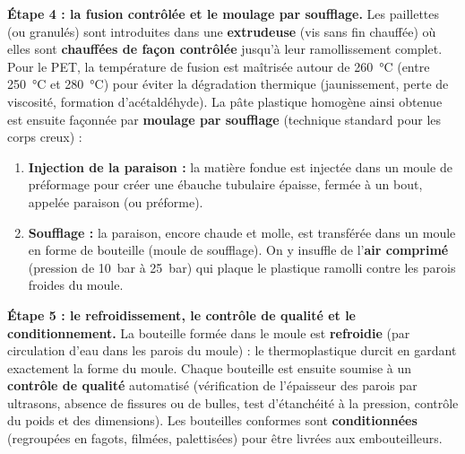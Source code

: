 \documentclass[11pt]{article}
\newcommand{\cle}[1]{{\popxbold\color{popdark}#1}}
\begin{document}
\textbf{Étape 4 : la fusion contrôlée et le moulage par soufflage.} Les paillettes (ou granulés) sont introduites dans une \textbf{extrudeuse} (vis sans fin chauffée) où elles sont \textbf{chauffées de façon contrôlée} jusqu'à leur ramollissement complet. Pour le PET, la température de fusion est maîtrisée autour de \SI{260}{\celsius} (entre \SI{250}{\celsius} et \SI{280}{\celsius}) pour éviter la dégradation thermique (jaunissement, perte de viscosité, formation d'acétaldéhyde). La pâte plastique homogène ainsi obtenue est ensuite façonnée par \textbf{moulage par soufflage} (technique standard pour les corps creux) :
\begin{enumerate}
\item \textbf{Injection de la paraison :} la matière fondue est injectée dans un moule de préformage pour créer une ébauche tubulaire épaisse, fermée à un bout, appelée \cle{paraison} (ou préforme).
\item \textbf{Soufflage :} la paraison, encore chaude et molle, est transférée dans un moule en forme de bouteille (moule de soufflage). On y insuffle de l'\textbf{air comprimé} (pression de \SI{10}{\bar} à \SI{25}{\bar}) qui plaque le plastique ramolli contre les parois froides du moule.
\end{enumerate}

\textbf{Étape 5 : le refroidissement, le contrôle de qualité et le conditionnement.} La bouteille formée dans le moule est \textbf{refroidie} (par circulation d'eau dans les parois du moule) : le thermoplastique durcit en gardant exactement la forme du moule. Chaque bouteille est ensuite soumise à un \textbf{contrôle de qualité} automatisé (vérification de l'épaisseur des parois par ultrasons, absence de fissures ou de bulles, test d'étanchéité à la pression, contrôle du poids et des dimensions). Les bouteilles conformes sont \textbf{conditionnées} (regroupées en fagots, filmées, palettisées) pour être livrées aux embouteilleurs.
\end{document}
